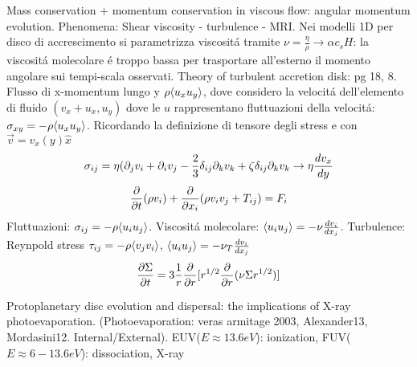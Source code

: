 \begin{workout}
	Mass conservation + momentum conservation in viscous flow: angular momentum evolution. Phenomena: Shear viscosity - turbulence - MRI.
	Nei modelli 1D per disco di accrescimento si parametrizza viscosit\'a tramite $\nu=\frac{\eta}{\rho}\to\alpha c_s H$: la viscosit\'a molecolare \'e troppo bassa  per trasportare all'esterno il momento angolare sui tempi-scala osservati.
	Theory of turbulent accretion disk: pg 18, 8.
	Flusso di x-momentum lungo y $\rho\exv{u_xu_y}$, dove considero la velocit\'a dell'elemento di fluido $(v_x+u_x,u_y)$ dove le $u$ rappresentano fluttuazioni della velocit\'a: $\sigma_{xy}=-\rho\exv{u_xu_y}$.
	Ricordando la definizione di tensore degli stress e con $\vec{v}=v_x(y)\hat{x}$
	\begin{equation}
	\sigma_{ij}=\eta(\partial_jv_i+\partial_iv_j-\frac{2}{3}\delta_{ij}\partial_kv_k+\zeta\delta_{ij}\partial_kv_k \to \eta\TDy{y}{v_x}
	\end{equation}
	\begin{equation}
	\PDof{t}(\rho v_i)+\PDof{x_i}(\rho v_iv_j+T_{ij})=F_i
	\end{equation}
	Fluttuazioni: $\sigma_{ij}=-\rho\exv{u_iu_j}$.
	Viscosit\'a molecolare: $\exv{u_iu_j}=-\nu\TDy{x_j}{v_i}$.
	Turbulence: Reynpold stress $\tau_{ij}=-\rho\exv{v_jv_i}$, $\exv{u_iu_j}=-\nu_T\TDy{x_j}{v_i}$
	\begin{equation}
	\PDy{t}{\Sigma}=3\frac{1}{r}\PDof{r}[r\expy{1/2}\PDof{r}(\nu\Sigma r\expy{1/2})]
	\end{equation}
\end{workout}

\begin{workout}
	Protoplanetary disc evolution and dispersal: the implications of X-ray photoevaporation.
	(Photoevaporation: veras armitage 2003, Alexander13, Mordasini12. Internal/External).
	EUV($E\approx13.6eV$): ionization, FUV($E\approx6-13.6eV$): dissociation, X-ray
\end{workout}

